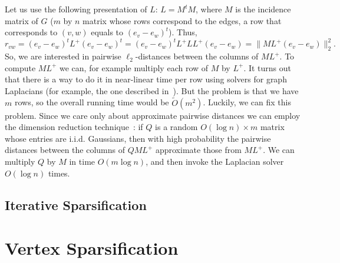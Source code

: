 \documentclass[12pt]{article}
\begin{document}
    Let us use the following presentation of $L$: $L = M^t M$, where $M$ is the incidence
    matrix of $G$ ($m$ by $n$ matrix whose rows correspond to the edges, a row that
    corresponds to $(v, w)$ equals to $(e_v - e_w)^t$). Thus,
    $$
        r_{vw} = (e_v - e_w)^t L^+ (e_v - e_w)^t = (e_v - e_w)^t L^+ L L^+ (e_v - e_w) =
        \|M L^+ (e_v - e_w)\|_2^2.
    $$
    So, we are interested in pairwise $\ell_2$-distances between the columns of
    $M L^+$.
    To compute $M L^+$ we can, for example multiply each row of $M$ by $L^+$. It turns
    out that there is a way to do it in near-linear time per row using solvers for graph
    Laplacians (for example, the one described in~\cite{KMP10}).
    But the problem is that we have $m$ rows, so the overall running time would be
    $\tilde{O}(m^2)$.
    Luckily, we can fix this problem. Since we care only about approximate pairwise
    distances we can employ the dimension reduction technique~\cite{DG03}:
    if $Q$ is a random
    $O(\log n) \times m$ matrix whose entries are i.i.d. Gaussians, then with
    high probability the pairwise distances between the columns of $QML^{+}$ approximate
    those from $ML^+$. We can multiply $Q$ by $M$ in time $O(m \log n)$, and then
    invoke the Laplacian solver $O(\log n)$ times.

    \subsection{Iterative Sparsification}

    \section{Vertex Sparsification}
    
    
\end{document}
